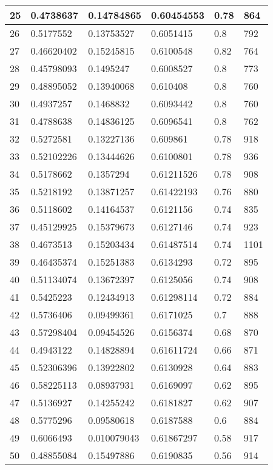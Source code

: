 \begin{longtable}{|l|l|l|l|l|l|}
25 & 0.4738637 & 0.14784865 & 0.60454553 & 0.78 & 864 \\ \hline 
26 & 0.5177552 & 0.13753527 & 0.6051415 & 0.8 & 792 \\ \hline 
27 & 0.46620402 & 0.15245815 & 0.6100548 & 0.82 & 764 \\ \hline 
28 & 0.45798093 & 0.1495247 & 0.6008527 & 0.8 & 773 \\ \hline 
29 & 0.48895052 & 0.13940068 & 0.610408 & 0.8 & 760 \\ \hline 
30 & 0.4937257 & 0.1468832 & 0.6093442 & 0.8 & 760 \\ \hline 
31 & 0.4788638 & 0.14836125 & 0.6096541 & 0.8 & 762 \\ \hline 
32 & 0.5272581 & 0.13227136 & 0.609861 & 0.78 & 918 \\ \hline 
33 & 0.52102226 & 0.13444626 & 0.6100801 & 0.78 & 936 \\ \hline 
34 & 0.5178662 & 0.1357294 & 0.61211526 & 0.78 & 908 \\ \hline 
35 & 0.5218192 & 0.13871257 & 0.61422193 & 0.76 & 880 \\ \hline 
36 & 0.5118602 & 0.14164537 & 0.6121156 & 0.74 & 835 \\ \hline 
37 & 0.45129925 & 0.15379673 & 0.6127146 & 0.74 & 923 \\ \hline 
38 & 0.4673513 & 0.15203434 & 0.61487514 & 0.74 & 1101 \\ \hline 
39 & 0.46435374 & 0.15251383 & 0.6134293 & 0.72 & 895 \\ \hline 
40 & 0.51134074 & 0.13672397 & 0.6125056 & 0.74 & 908 \\ \hline 
41 & 0.5425223 & 0.12434913 & 0.61298114 & 0.72 & 884 \\ \hline 
42 & 0.5736406 & 0.09499361 & 0.6171025 & 0.7 & 888 \\ \hline 
43 & 0.57298404 & 0.09454526 & 0.6156374 & 0.68 & 870 \\ \hline 
44 & 0.4943122 & 0.14828894 & 0.61611724 & 0.66 & 871 \\ \hline 
45 & 0.52306396 & 0.13922802 & 0.6130928 & 0.64 & 883 \\ \hline 
46 & 0.58225113 & 0.08937931 & 0.6169097 & 0.62 & 895 \\ \hline 
47 & 0.5136927 & 0.14255242 & 0.6181827 & 0.62 & 907 \\ \hline 
48 & 0.5775296 & 0.09580618 & 0.6187588 & 0.6 & 884 \\ \hline 
49 & 0.6066493 & 0.010079043 & 0.61867297 & 0.58 & 917 \\ \hline 
50 & 0.48855084 & 0.15497886 & 0.6190835 & 0.56 & 914 \\ \hline 
\end{longtable}